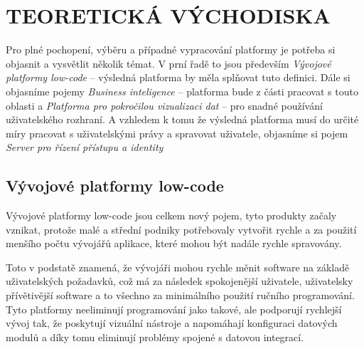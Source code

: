 \chapter{TEORETICKÁ VÝCHODISKA}
\par Pro plné pochopení, výběru a případné vypracování platformy je potřeba si objasnit a vysvětlit několik témat. V prní řadě to jsou především \textit{Vývojové platformy low-code} -- výsledná platforma by měla splňovat tuto definici. Dále si objasníme pojemy \textit{Business inteligence} -- platforma bude z části pracovat s touto oblasti a \textit{Platforma pro pokročilou vizualizaci dat} -- pro snadné používání uživatelského rozhraní. A vzhledem k tomu že výsledná platforma musí do určité míry pracovat s uživatelskými právy a spravovat uživatele, objasníme si pojem \textit{Server pro řízení přístupu a identity}

\section{Vývojové platformy low-code}
\par Vývojové platformy low-code jsou celkem nový pojem, tyto produkty začaly vznikat, protože malé a střední podniky potřebovaly vytvořit rychle a za použití menšího počtu vývojářů aplikace, které mohou být nadále rychle spravovány. \cite{pcmag-no-coding}

\par Toto v podstatě znamená, že vývojáři mohou rychle měnit software na základě uživatelských požadavků, což má za následek spokojenější uživatele, uživatelsky přívětivější software a to všechno za minimálního použití ručního programování. Tyto platformy neeliminují programování jako takové, ale podporují rychlejší vývoj tak, že poskytují vizuální nástroje a napomáhají konfiguraci datových modulů a díky tomu eliminují problémy spojené s datovou integrací. \cite{low-code-customer-want}

